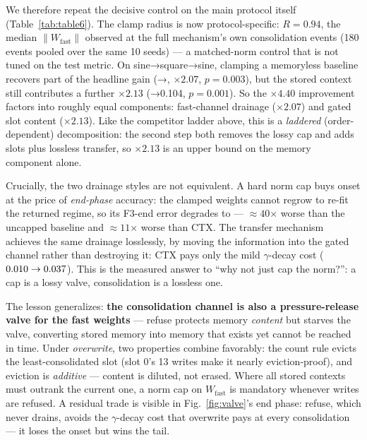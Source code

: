 \documentclass[11pt]{article}
\begin{document}
We therefore repeat the decisive control on the main protocol itself
(Table~\ref{tab:table6}). The clamp radius is now protocol-specific:
\(R{=}0.94\), the median \(\|W_{\mathrm{fast}}\|\) observed at the full
mechanism's own consolidation events (180 events pooled over the same
10 seeds) --- a matched-norm control that is not tuned on the test
metric. On sine→square→sine, clamping a memoryless baseline recovers
part of the headline gain (\blockOnset→\clampOnlyOnset, \(\times2.07\),
\(p{=}0.003\)), but the stored context still contributes a further
\(\times2.13\) (\clampOnlyOnset→0.104, \(p{=}0.001\)). So the \(\times4.40\)
improvement factors into roughly equal components: fast-channel
drainage (\(\times2.07\)) and gated slot content (\(\times2.13\)). Like
the competitor ladder above, this is a \emph{laddered} (order-dependent)
decomposition: the second step both removes the lossy cap and adds
slots plus lossless transfer, so \(\times2.13\) is an upper bound on
the memory component alone.

Crucially, the two drainage styles are not equivalent. A hard norm
cap buys onset at the price of \emph{end-phase} accuracy: the clamped
weights cannot regrow to re-fit the returned regime, so its F3-end
error degrades to \clampEnd{} --- \(\approx 40\)× worse than the uncapped
baseline and \(\approx 11\)× worse than CTX. The transfer mechanism achieves the same drainage
losslessly, by moving the information into the gated channel rather
than destroying it: CTX pays only the mild \(\gamma\)-decay cost
(\(0.010\to0.037\)). This is the measured answer to ``why not just cap
the norm?'': a cap is a lossy valve, consolidation is a lossless one.

\begin{table}[t]
\centering\small
\caption{Drainage control on the main protocol, 10 seeds. The norm
cap alone recovers $\times 2.07$; gated memory a further $\times 2.13$;
but the lossy cap destroys end-phase accuracy while transfer does
not.}
\label{tab:table6}

\end{table}

The lesson generalizes: \textbf{the consolidation channel is also a
pressure-release valve for the fast weights} --- refuse protects
memory \emph{content} but starves the valve, converting stored memory into
memory that exists yet cannot be reached in time. Under \emph{overwrite},
two properties combine favorably: the count rule evicts the
least-consolidated slot (slot 0's 13 writes make it nearly
eviction-proof), and eviction is \emph{additive} --- content is diluted, not
erased. Where all stored contexts must outrank the current one, a
norm cap on \(W_{\mathrm{fast}}\) is mandatory whenever writes are
refused. A residual trade is visible in Fig.~\ref{fig:valve}'s end phase: refuse,
which never drains, avoids the \(\gamma\)-decay cost that overwrite
pays at every consolidation --- it loses the onset but wins the tail.
\end{document}
